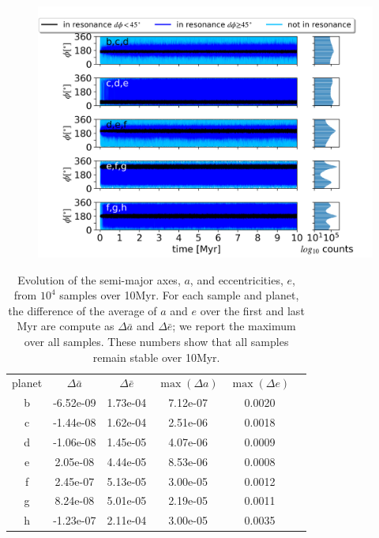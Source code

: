 \documentclass[twocolumn]{aastex63}
\begin{document}
\begin{figure}
    \centering
    \includegraphics[width =\hsize]{figures/tlM.png}
    \label{fig:tlM}
\end{figure}

\begin{table}
    \centering
    \begin{tabular}{|c|c c c c c}
        planet & $\Delta \bar{a}$ & $\Delta \bar{e}$ & $\max (\Delta a)$ & $\max(\Delta e)$ & \\
        b      & -6.52e-09        & 1.73e-04         & 7.12e-07          & 0.0020             \\
        c      & -1.44e-08        & 1.62e-04         & 2.51e-06          & 0.0018             \\
        d      & -1.06e-08        & 1.45e-05         & 4.07e-06          & 0.0009             \\
        e      & 2.05e-08         & 4.44e-05         & 8.53e-06          & 0.0008             \\
        f      & 2.45e-07         & 5.13e-05         & 3.00e-05          & 0.0012             \\
        g      & 8.24e-08         & 5.01e-05         & 2.19e-05          & 0.0011             \\
        h      & -1.23e-07        & 2.11e-04         & 3.00e-05          & 0.0035
    \end{tabular}
    \caption{Evolution of the semi-major axes, $a$, and eccentricities, $e$, from $10^4$ samples over 10Myr. For each sample and planet, the difference of the average of $a$ and $e$ over the first and last Myr are compute as $\Delta \bar{a}$ and  $\Delta \bar{e}$; we report the maximum over all samples. These numbers show that all samples remain stable over 10Myr.}
    \label{tab:averageAE}
\end{table}
\end{document}
